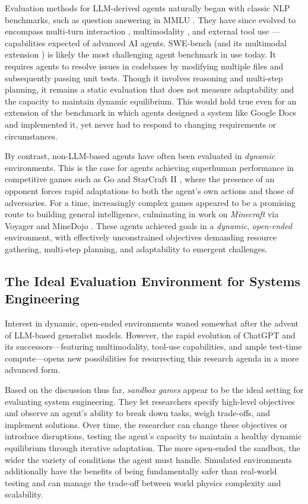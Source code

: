 Evaluation methods for LLM-derived agents naturally began with classic NLP benchmarks, such as question answering in MMLU \cite{hendrycks2021mmlu}. They have since evolved to encompass multi-turn interaction \cite{zheng2023mtbench}, multimodality \cite{yue2024mmmu}, and external tool use \cite{zhou2023agentbench, he2024webvoyager}—capabilities expected of advanced AI agents. SWE-bench \cite{jimenez2024swebench} (and its multimodal extension \cite{yang2024swebenchmultimodalaisystems}) is likely the most challenging agent benchmark in use today. It requires agents to resolve issues in codebases by modifying multiple files and subsequently passing unit tests. Though it involves reasoning and multi-step planning, it remains a static evaluation that does not measure adaptability and the capacity to maintain dynamic equilibrium. This would hold true even for an extension of the benchmark in which agents designed a system like Google Docs and implemented it, yet never had to respond to changing requirements or circumstances.

By contrast, non-LLM-based agents have often been evaluated in \emph{dynamic} environments. This is the case for agents achieving superhuman performance in competitive games such as Go \cite{silver2017alphazero} and StarCraft II \cite{vinyals2019alphastar}, where the presence of an opponent forces rapid adaptations to both the agent’s own actions and those of adversaries. For a time, increasingly complex games appeared to be a promising route to building general intelligence, culminating in work on \textit{Minecraft} via Voyager \cite{wang2023voyager} and MineDojo \cite{fan2022minedojo}. These agents achieved goals in a \emph{dynamic}, \emph{open-ended} environment, with effectively unconstrained objectives demanding resource gathering, multi-step planning, and adaptability to emergent challenges. 


\subsection{The Ideal Evaluation Environment for Systems Engineering}
Interest in dynamic, open-ended environments waned somewhat after the advent of LLM-based generalist models. However, the rapid evolution of ChatGPT and its successors—featuring multimodality, tool-use capabilities, and ample test-time compute—opens new possibilities for resurrecting this research agenda in a more advanced form.

Based on the discussion thus far, \emph{sandbox games} appear to be the ideal setting for evaluating system engineering. They let researchers specify high-level objectives and observe an agent’s ability to break down tasks, weigh trade-offs, and implement solutions. Over time, the researcher can change these objectives or introduce disruptions, testing the agent’s capacity to maintain a healthy dynamic equilibrium through iterative adaptation. The more open-ended the sandbox, the wider the variety of conditions the agent must handle. Simulated environments additionally have the benefits of being fundamentally safer than real-world testing and can manage the trade-off between world physics complexity and scalability.

